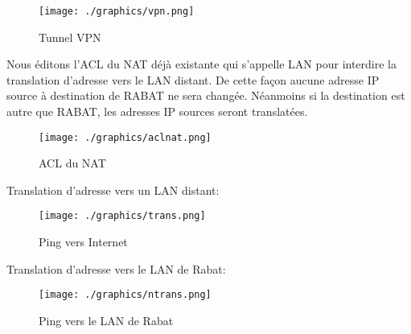 \documentclass[12pt,a4paper]{report}
\begin{document}
		\begin{figure}[!hbtp]
			\centering
			\texttt{[image: ./graphics/vpn.png]}
			\caption{Tunnel VPN}
		\end{figure}
		\newpage


		Nous éditons l’ACL du NAT déjà existante qui s’appelle LAN pour interdire la translation d’adresse vers le LAN distant. De cette façon aucune adresse IP source à destination de RABAT ne sera changée. Néanmoins si la destination est autre que RABAT, les adresses IP sources seront translatées.
		\begin{figure}[!hbtp]
			\centering
			\texttt{[image: ./graphics/aclnat.png]}
			\caption{ACL du NAT}
		\end{figure}

		Translation d'adresse vers un LAN distant: 
		\begin{figure}[!hbtp]
			\centering
			\texttt{[image: ./graphics/trans.png]}
			\caption{Ping vers Internet}
		\end{figure}

		Translation d'adresse vers le LAN de Rabat:
		\begin{figure}[!hbtp]
			\centering
			\texttt{[image: ./graphics/ntrans.png]}
			\caption{Ping vers le LAN de Rabat}
		\end{figure}



		\newpage
\end{document}
